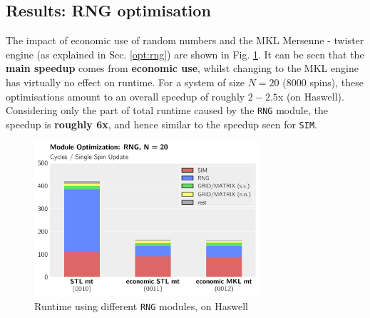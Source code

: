\documentclass[letterpaper]{article}
\begin{document}
\subsection{Results: RNG optimisation}\label{res:RNG}
The impact of economic use of random numbers and the MKL Mersenne - twister engine (as explained in Sec. \ref{opt:rng}) are shown in Fig. \ref{RNG:Has:20}. \newline
It can be seen that the \textbf{main speedup} comes from \textbf{economic use}, whilst changing to the MKL engine has virtually no effect on runtime. \newline
For a system of size $N = 20$ ($8000$ spins), these optimisations amount to an overall speedup of roughly $2 - 2.5$x (on Haswell). Considering only the part of total runtime caused by the \texttt{RNG} module, the speedup is \textbf{roughly $\mathbf{6}$x}, and hence similar to the speedup seen for \texttt{SIM}.
	\begin{figure}[h]\centering
	  \includegraphics[width = 8.36cm]{plots/dg_20_0.pdf}
	  \caption{Runtime using different \texttt{RNG} modules, on Haswell}
	  \label{RNG:Has:20}
	\end{figure}
\end{document}
